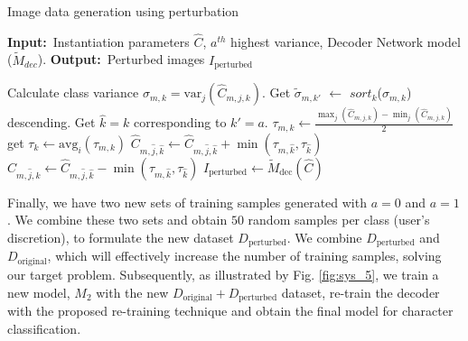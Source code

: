 \renewcommand{\algorithmicrequire}{\textbf{Input:}}
\renewcommand{\algorithmicensure}{\textbf{Output:}}

\begin{algorithm}\caption{Image data generation using perturbation} \label{algo:1}
\algorithmicrequire \ Instantiation parameters $\widehat{C}$, $a^{th}$ highest variance, Decoder Network model ($\widetilde{M}_{dec}$). \newline
\algorithmicensure \ Perturbed images $I_{\mathrm{perturbed}}$

\begin{algorithmic}[1]
\State  Calculate class variance $\sigma_{m,k} = \mathrm{var}_j(\widehat{C}_{m,j,k})$.   
\State  Get $\tilde{\sigma}_{m,k'}$ $\gets$ $sort_k$($\sigma_{m,k}$) descending.    
\State Get $\hat{k}=k$ corresponding to $k' = a$.
\State $ \tau_{m,k} \gets \frac{\max_{j}(\widehat{C}_{m,j,k}) - \min_{j}(\widehat{C}_{m,j,k})}{2}$
\State get $\tau_k \gets \mathrm{avg}_i(\tau_{m,k})$
\State $\widehat{C}_{m,\hat{j},\hat{k}} \gets  \widehat{C}_{m,\hat{j},\hat{k}} + \min(\tau_{m,\hat{k}}, \tau_{\hat{k}})$
\Else
\State $\widehat{C}_{m,\hat{j},\hat{k}} \gets  \widehat{C}_{m,\hat{j},\hat{k}} - \min(\tau_{m,\hat{k}}, \tau_{\hat{k}})$
\EndIf
\EndFor
\State $I_{\mathrm{perturbed}} \gets \widetilde{M}_{\mathrm{dec}}(\widehat{C})$ 
\end{algorithmic}
\end{algorithm}

Finally, we have two new sets of training samples generated with $a=0$ and $a=1$. We combine these two sets and obtain $50$ random samples per class (user's discretion), to formulate the new dataset $D_{\mathrm{perturbed}}$. We combine $D_{\mathrm{perturbed}}$ and $D_{\mathrm{original}}$, which will effectively increase the number of training samples, solving our target problem. Subsequently, as illustrated by Fig. \ref{fig:sys_5}, we train a new model, $M_2$ with the new $D_{\mathrm{original}}+D_{\mathrm{perturbed}}$ dataset, re-train the decoder with the proposed re-training technique and obtain the final model for character classification.